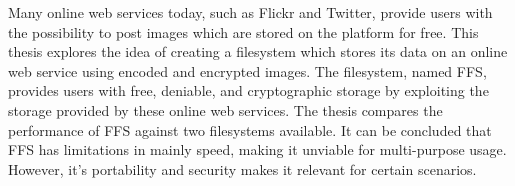 




Many online web services today, such as Flickr and Twitter, provide users with the possibility to post images which are stored on the platform for free. This thesis explores the idea of creating a filesystem which stores its data on an online web service using encoded and encrypted images. The filesystem, named \gls{FFS}, provides users with free, deniable, and cryptographic storage by exploiting the storage provided by these online web services. The thesis compares the performance of \gls{FFS} against two filesystems available. It can be concluded that \gls{FFS} has limitations in mainly speed, making it unviable for multi-purpose usage. However, it's portability and security makes it relevant for certain scenarios.

